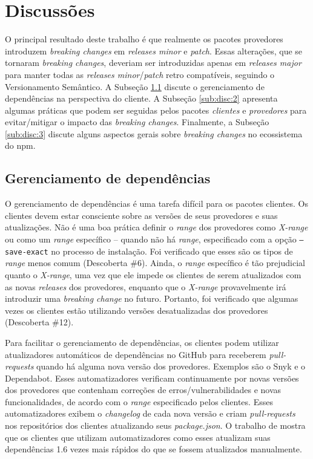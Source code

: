 \chapter{Discussões}
\label{cap:discussoes}

O principal resultado deste trabalho é que realmente os pacotes provedores introduzem \textit{breaking changes} em \textit{releases minor} e \textit{patch}. Essas alterações, que se tornaram \textit{breaking changes}, deveriam ser introduzidas apenas em \textit{releases major} para manter todas as \textit{releases minor}/\textit{patch} retro compatíveis, seguindo o Versionamento Semântico. A Subseção \ref{sub:disc:1} discute o gerenciamento de dependências na perspectiva do cliente. A Subseção \ref{sub:disc:2} apresenta algumas práticas que podem ser seguidas pelos pacotes \textit{clientes} e \textit{provedores} para evitar/mitigar o impacto das \textit{breaking changes}. Finalmente, a Subseção \ref{sub:disc:3} discute alguns aspectos gerais sobre \textit{breaking changes} no ecossistema do \textsf{npm}.

\section{Gerenciamento de dependências}
\label{sub:disc:1}

O gerenciamento de dependências é uma tarefa difícil para os pacotes clientes. Os clientes devem estar consciente sobre as versões de seus provedores e suas atualizações. Não é uma boa prática definir o \textit{range} dos provedores como \textit{X-range} ou como um \textit{range} específico -- quando não há \textit{range}, especificado com a opção \texttt{--save-exact} no processo de instalação. Foi verificado que esses são os tipos de \textit{range} menos comum (Descoberta \#6). Ainda, o \textit{range} específico é tão prejudicial quanto o \textit{X-range}, uma vez que ele impede os clientes de serem atualizados com as novas \textit{releases} dos provedores, enquanto que o \textit{X-range} provavelmente irá introduzir uma \textit{breaking change} no futuro. Portanto, foi verificado que algumas vezes os clientes estão utilizando versões desatualizadas dos provedores (Descoberta \#12).

Para facilitar o gerenciamento de dependências, os clientes podem utilizar atualizadores automáticos de dependências no \textsf{GitHub} para receberem \textit{pull-requests} quando há alguma nova versão dos provedores. Exemplos são o \textsf{Snyk} e o \textsf{Dependabot}. Esses automatizadores verificam continuamente por novas versões dos provedores que contenham correções de erros/vulnerabilidades e novas funcionalidades, de acordo com o \textit{range} especificado pelos clientes. Esses automatizadores exibem o \textit{changelog} de cada nova versão e criam \textit{pull-requests} nos repositórios dos clientes atualizando seus \textit{package.json}. O trabalho de  mostra que os clientes que utilizam automatizadores como esses atualizam suas dependências 1.6 vezes mais rápidos do que se fossem atualizados manualmente.

